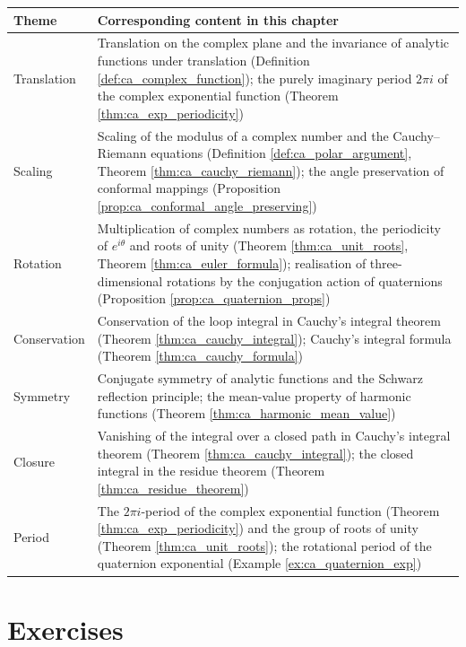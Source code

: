 \begingroup
\renewcommand{\arraystretch}{1.3}
\begin{longtable}{>{\raggedright\arraybackslash}p{3cm}>{\raggedright\arraybackslash}p{10.5cm}}
\toprule
Theme & Corresponding content in this chapter \\
\midrule
Translation & Translation on the complex plane and the invariance of analytic functions under translation (Definition \ref{def:ca_complex_function}); the purely imaginary period $2\pi i$ of the complex exponential function (Theorem \ref{thm:ca_exp_periodicity}) \\
Scaling & Scaling of the modulus of a complex number and the Cauchy--Riemann equations (Definition \ref{def:ca_polar_argument}, Theorem \ref{thm:ca_cauchy_riemann}); the angle preservation of conformal mappings (Proposition \ref{prop:ca_conformal_angle_preserving}) \\
Rotation & Multiplication of complex numbers as rotation, the periodicity of $e^{i\theta}$ and roots of unity (Theorem \ref{thm:ca_unit_roots}, Theorem \ref{thm:ca_euler_formula}); realisation of three-dimensional rotations by the conjugation action of quaternions (Proposition \ref{prop:ca_quaternion_props}) \\
Conservation & Conservation of the loop integral in Cauchy's integral theorem (Theorem \ref{thm:ca_cauchy_integral}); Cauchy's integral formula (Theorem \ref{thm:ca_cauchy_formula}) \\
Symmetry & Conjugate symmetry of analytic functions and the Schwarz reflection principle; the mean-value property of harmonic functions (Theorem \ref{thm:ca_harmonic_mean_value}) \\
Closure & Vanishing of the integral over a closed path in Cauchy's integral theorem (Theorem \ref{thm:ca_cauchy_integral}); the closed integral in the residue theorem (Theorem \ref{thm:ca_residue_theorem}) \\
Period & The $2\pi i$-period of the complex exponential function (Theorem \ref{thm:ca_exp_periodicity}) and the group of roots of unity (Theorem \ref{thm:ca_unit_roots}); the rotational period of the quaternion exponential (Example \ref{ex:ca_quaternion_exp}) \\
\bottomrule
\end{longtable}
\endgroup

\clearpage

\section*{Exercises}


